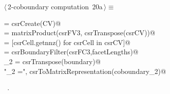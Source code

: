 \documentclass[11pt,oneside]{article}	%
\begin{document}
\begin{flushleft} \small
\begin{minipage}{\linewidth} \label{scrap42}
\protect{}$\langle\,$2-coboundary computation\nobreak\ {\footnotesize 20a}$\,\rangle\equiv$
\vspace{-1ex}
\begin{list}{}{} \item
\mbox{}\verb@csrCV = csrCreate(CV)@\\
\mbox{} = matrixProduct(csrFV3, csrTranspose(csrCV))@\\
\mbox{}\verb@facetLengths = [csrCell.getnnz() for csrCell in csrCV]@\\
\mbox{}\verb@boundary = csrBoundaryFilter(csrFC3,facetLengths)@\\
\mbox{}\verb@coboundary_2 = csrTranspose(boundary)@\\
\mbox{}\verb@print "\ncoboundary_2 =\n", csrToMatrixRepresentation(coboundary_2)@\\
\mbox{}\verb@@{\NWsep}
\end{list}
\vspace{-1ex}
\footnotesize\addtolength{\baselineskip}{-1ex}
\begin{list}{}{\setlength{\itemsep}{-\parsep}\setlength{\itemindent}{-\leftmargin}}
\item \NWtxtMacroRefIn\ .
\end{list}
\end{minipage}\\[4ex]
\end{flushleft}
\end{document}
